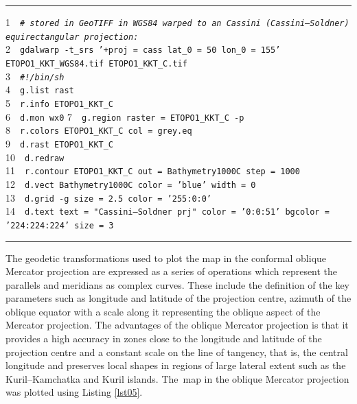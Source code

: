 \documentclass[technologies,article,accept,pdftex,moreauthors]{Definitions/mdpi}
\begin{document}
\begin{listing}[H]
\caption{GRASS GIS %
 script for plotting map in Cassini--Soldner projection.}\label{lst04}
 \rule{\columnwidth}{1pt}
 \raggedright
1~~\texttt{\emph{\# stored in GeoTIFF in WGS84 warped to an Cassini (Cassini--Soldner) equirectangular projection:\\}}
2~~\texttt{gdalwarp -t\_srs '+proj = cass lat\_0 = 50 lon\_0 = 155' ETOPO1\_KKT\_WGS84.tif ETOPO1\_KKT\_C.tif\\}
3~~\texttt{\emph{\#!/bin/sh\\}}
4~~\texttt{g.list rast\\}
5~~\texttt{r.info ETOPO1\_KKT\_C\\}
6~~\texttt{d.mon wx0}
7~~\texttt{g.region raster = ETOPO1\_KKT\_C -p\\}
8~~\texttt{r.colors ETOPO1\_KKT\_C col = grey.eq\\}
9~~\texttt{d.rast ETOPO1\_KKT\_C\\}
10~~\texttt{d.redraw\\}
11~~\texttt{r.contour ETOPO1\_KKT\_C out = Bathymetry1000C step = 1000\\}
12~~\texttt{d.vect Bathymetry1000C color = 'blue' width = 0\\}
13~~\texttt{d.grid -g size = 2.5 color = '255:0:0'\\}
14~~\texttt{d.text text = "Cassini--Soldner prj" color = '0:0:51' bgcolor = '224:224:224' size = 3\\}
\rule{\columnwidth}{1pt}
\end{listing}

The geodetic transformations used to plot the map in the conformal oblique Mercator projection are expressed as a series of operations which represent the parallels and meridians as complex curves. These include the definition of the key parameters such as longitude and latitude of the projection centre, azimuth of the oblique equator with a scale along it representing the oblique aspect of the Mercator projection. The advantages of the oblique Mercator projection is that it provides a high accuracy in zones close to the longitude and latitude of the projection centre and a constant scale on the line of tangency, that is, the central longitude and preserves local shapes in regions of large lateral extent such as the Kuril--Kamchatka and Kuril islands. The~map in the oblique Mercator projection was plotted using Listing \ref{lst05}.
\end{document}
